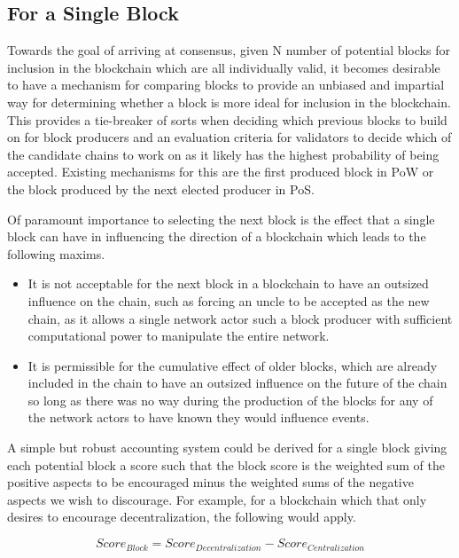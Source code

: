 \documentclass{article}
\begin{document}
\subsection{For a Single Block}
Towards the goal of arriving at consensus, given N number of potential blocks
for inclusion in the blockchain which are all individually valid, it becomes
desirable to have a mechanism for comparing blocks to provide an unbiased and
impartial way for determining whether a block is more ideal for inclusion in
the blockchain. This provides a tie-breaker of sorts when deciding which
previous blocks to build on for block producers and an evaluation criteria for
validators to decide which of the candidate chains to work on as it likely has
the highest probability of being accepted. Existing mechanisms for this are the
first produced block in PoW or the block produced by the next elected producer
in PoS.

Of paramount importance to selecting the next block is the effect that a single
block can have in influencing the direction of a blockchain which leads to the
following maxims.

\begin{itemize}
  \item It is not acceptable for the next block in a blockchain to have an outsized
        influence on the chain, such as forcing an uncle to be accepted as the new
        chain, as it allows a single network actor such a block producer with
        sufficient computational power to manipulate the entire network.
  \item It is permissible for the cumulative effect of older blocks, which are already
        included in the chain to have an outsized influence on the future of the chain
        so long as there was no way during the production of the blocks for any of the
        network actors to have known they would influence events.
\end{itemize}

A simple but robust accounting system could be derived for a single block
giving each potential block a score such that the block score is the weighted
sum of the positive aspects to be encouraged minus the weighted sums of the
negative aspects we wish to discourage. For example, for a blockchain which
that only desires to encourage decentralization, the following would apply.

\[
  \mathit{Score}_{\mathit{Block}} = \mathit{Score}_{\mathit{Decentralization}} - \mathit{Score}_{\mathit{Centralization}}
\]
\end{document}

